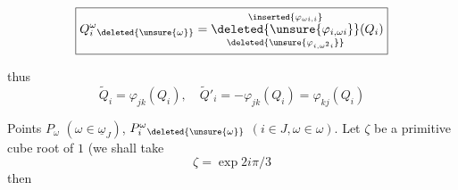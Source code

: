 
\[
\boxed{Q_i^\omega{}_{\deleted{\unsure{\omega}}}=
\underset{\deleted{\unsure{\varphi_{i,\omega^2i}}}}
{\overset{\inserted{\varphi_{\omega i,i}}}
{\deleted{\unsure{\varphi_{i,\omega i}}}}}(Q_i)}
\]


thus
\[
\widetilde{Q}_i=\varphi_{jk}(Q_i),\quad
\widetilde{Q}'_i=-\varphi_{jk}(Q_i)=\varphi_{kj}(Q_i)
\]

Points $P_\omega$ $(\omega\in\underline{\omega}_J)$,
$P_i^\omega{}_{\deleted{\unsure{\omega}}}$ $(i\in J,\omega\in\omega)$.
Let $\zeta$ be a \deleted{$\unsure{\zeta}$} primitive cube root of $1$ (we shall take \deleted{$\unsure{\zeta}$}
\[
\zeta=\exp 2i\pi/3
\]
then

